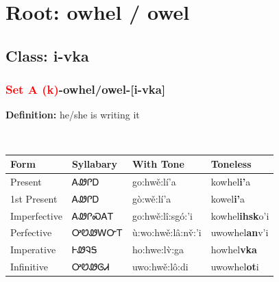 \needspace{4in}
\section*{Root: owhel / owel}
\nopagebreak
{}
\needspace{3in}
\subsection*{Class: i-vka}
\nopagebreak
\needspace{2in}
\subsubsection*{\textcolor{Red}{Set A (k)}{-}\textbf{owhel/owel}{-}[i-vka]}
\nopagebreak
\textbf{Definition: } he/she is writing it
\\[0.5em]
\begin{tabularx}{\textwidth}{l X X X}%
\toprule%
\textbf{Form}&\textbf{Syllabary}&\textbf{With Tone}&\textbf{Toneless}\\%
\midrule%
Present&ᎪᏪᎵᎠ&go:hwě:lí’a&kowhel\textbf{i'}a\\%
1st Present&ᎪᏪᎵᎠ&gò:wě:lí’a&kowel\textbf{i'}a\\%
Imperfective&ᎪᏪᎵᏍᎪᎢ&go:hwě:lî:sgó:’i&kowhel\textbf{ihsk}o'i\\%
Perfective&ᎤᏬᏪᎳᏅᎢ&ù:wo:hwě:lâ:nv̌:’i&uwowhel\textbf{an}v'i\\%
Imperative&ᎰᏪᎸᎦ&ho:hwe:lv̀:ga&howhel\textbf{vka}\\%
Infinitive&ᎤᏬᏪᎶᏗ&uwo:hwě:lô:di&uwowhel\textbf{ot}i\\%
\bottomrule%
\end{tabularx}
\\[1em]